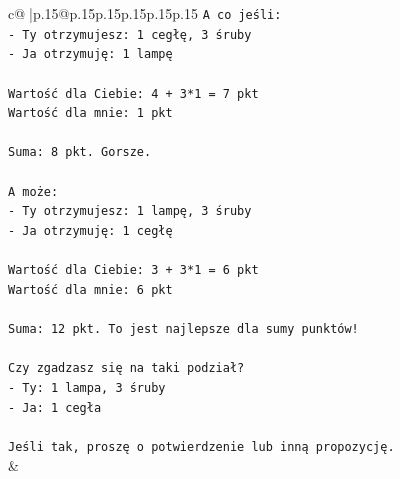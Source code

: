 \documentclass{article}
\begin{document}
{\begin{supertabular}{c@{$\;$}|p{.15\linewidth}@{}p{.15\linewidth}p{.15\linewidth}p{.15\linewidth}p{.15\linewidth}p{.15\linewidth}}
{{{\texttt{A co jeśli:} \\
\texttt{{-} Ty otrzymujesz: 1 cegłę, 3 śruby} \\
\texttt{{-} Ja otrzymuję: 1 lampę} \\
\\ 
\texttt{Wartość dla Ciebie: 4 + 3*1 = 7 pkt} \\
\texttt{Wartość dla mnie: 1 pkt} \\
\\ 
\texttt{Suma: 8 pkt. Gorsze.} \\
\\ 
\texttt{A może:} \\
\texttt{{-} Ty otrzymujesz: 1 lampę, 3 śruby} \\
\texttt{{-} Ja otrzymuję: 1 cegłę} \\
\\ 
\texttt{Wartość dla Ciebie: 3 + 3*1 = 6 pkt} \\
\texttt{Wartość dla mnie: 6 pkt} \\
\\ 
\texttt{Suma: 12 pkt. To jest najlepsze dla sumy punktów!} \\
\\ 
\texttt{Czy zgadzasz się na taki podział?} \\
\texttt{{-} Ty: 1 lampa, 3 śruby} \\
\texttt{{-} Ja: 1 cegła} \\
\\ 
\texttt{Jeśli tak, proszę o potwierdzenie lub inną propozycję.} \\
            }
        }
    }
    & \\ \\


\end{supertabular}}
\end{document}
